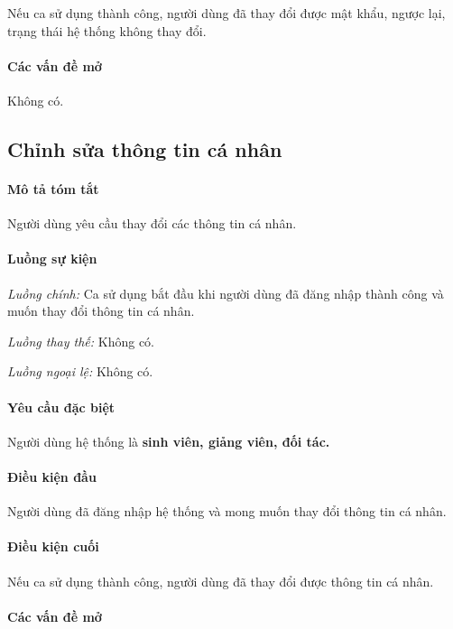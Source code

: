 \documentclass[./../main.tex]{subfiles}
\begin{document}
Nếu ca sử dụng thành công, người dùng đã thay đổi được mật khẩu, ngược
lại, trạng thái hệ thống không thay đổi.

\paragraph*{Các vấn đề mở}

Không có.

\subsection{Chỉnh sửa thông tin cá nhân}

\paragraph*{Mô tả tóm tắt}

Người dùng yêu cầu thay đổi các thông tin cá nhân.

\paragraph*{Luồng sự kiện}

\emph{Luồng chính:} Ca sử dụng bắt đầu khi người dùng đã đăng nhập thành
công và muốn thay đổi thông tin cá nhân.

\emph{Luồng thay thế:} Không có.

\emph{Luồng ngoại lệ:} Không có.

\paragraph*{Yêu cầu đặc biệt}

Người dùng hệ thống là \textbf{sinh viên, giảng viên, đối tác.}

\paragraph*{Điều kiện đầu}

Người dùng đã đăng nhập hệ thống và mong muốn thay đổi thông tin cá
nhân.

\paragraph*{Điều kiện cuối}

Nếu ca sử dụng thành công, người dùng đã thay đổi được thông tin cá
nhân.

\paragraph*{Các vấn đề mở}
\end{document}
